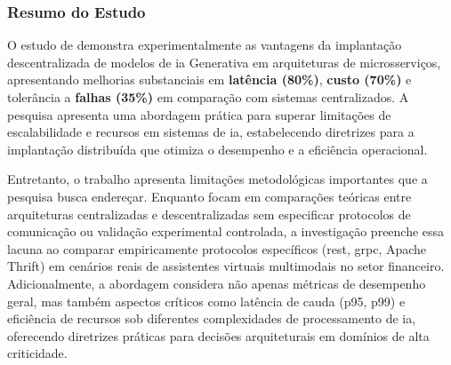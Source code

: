 \subsubsection{Resumo do Estudo}

O estudo de \textcite{jhingran_decentralized_2024} demonstra experimentalmente as vantagens da implantação descentralizada de modelos de \gls{ia} Generativa em arquiteturas de microsserviços, apresentando melhorias substanciais em \textbf{latência (80\%)}, \textbf{custo (70\%)} e tolerância a \textbf{falhas (35\%)} em comparação com sistemas centralizados. A pesquisa apresenta uma abordagem prática para superar limitações de escalabilidade e recursos em sistemas de \gls{ia}, estabelecendo diretrizes para a implantação distribuída que otimiza o desempenho e a eficiência operacional.

Entretanto, o trabalho apresenta limitações metodológicas importantes que a pesquisa busca endereçar. Enquanto \textcite{jhingran_decentralized_2024} focam em comparações teóricas entre arquiteturas centralizadas e descentralizadas sem especificar protocolos de comunicação ou validação experimental controlada, a investigação preenche essa lacuna ao comparar empiricamente protocolos específicos (\gls{rest}, \gls{grpc}, Apache Thrift) em cenários reais de assistentes virtuais multimodais no setor financeiro. Adicionalmente, a abordagem considera não apenas métricas de desempenho geral, mas também aspectos críticos como latência de cauda (p95, p99) e eficiência de recursos sob diferentes complexidades de processamento de \gls{ia}, oferecendo diretrizes práticas para decisões arquiteturais em domínios de alta criticidade.
